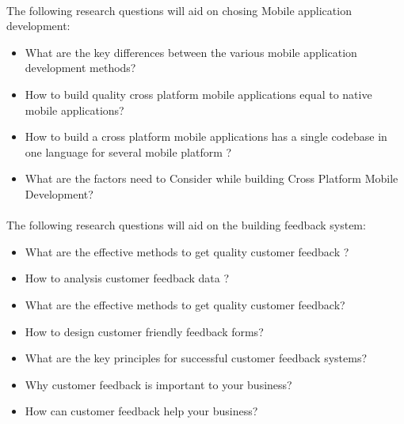 \paragraph{}
The following research questions will aid on chosing Mobile application development:
\begin{itemize}
\item \textbf{}  What are the key differences between the various mobile application development methods?
\item \textbf{}  How to build quality cross platform mobile applications equal to native mobile applications?
\item \textbf{}  How to build a cross platform mobile applications has a single codebase in one language for several mobile platform ?
\item \textbf{}  What are the factors need to Consider while building Cross Platform Mobile Development?
\end{itemize}

\paragraph{}
The following research questions will aid on the building feedback system:

\begin{itemize}
\item \textbf{}  What are the  effective methods  to get quality customer feedback ?
\item \textbf{}  How to analysis  customer feedback data ?
\item \textbf{}  What are the  effective methods  to get quality customer feedback?
\item \textbf{}  How to design customer friendly feedback forms?
\item \textbf{}  What are the key principles for successful customer feedback systems?
\item \textbf{}  Why customer feedback is important to your business?
\item \textbf{}  How can customer feedback help your business?

\end{itemize}









